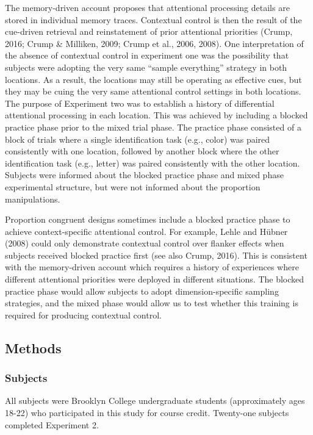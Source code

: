 \documentclass[english,,man,floatsintext]{apa6}
\begin{document}
The memory-driven account proposes that attentional processing details
are stored in individual memory traces. Contextual control is then the
result of the cue-driven retrieval and reinstatement of prior
attentional priorities (Crump, 2016; Crump \& Milliken, 2009; Crump et
al., 2006, 2008). One interpretation of the absence of contextual
control in experiment one was the possibility that subjects were
adopting the very same \enquote{sample everything} strategy in both
locations. As a result, the locations may still be operating as
effective cues, but they may be cuing the very same attentional control
settings in both locations. The purpose of Experiment two was to
establish a history of differential attentional processing in each
location. This was achieved by including a blocked practice phase prior
to the mixed trial phase. The practice phase consisted of a block of
trials where a single identification task (e.g., color) was paired
consistently with one location, followed by another block where the
other identification task (e.g., letter) was paired consistently with
the other location. Subjects were informed about the blocked practice
phase and mixed phase experimental structure, but were not informed
about the proportion manipulations.

Proportion congruent designs sometimes include a blocked practice phase
to achieve context-specific attentional control. For example, Lehle and
Hübner (2008) could only demonstrate contextual control over flanker
effects when subjects received blocked practice first (see also Crump,
2016). This is consistent with the memory-driven account which requires
a history of experiences where different attentional priorities were
deployed in different situations. The blocked practice phase would allow
subjects to adopt dimension-specific sampling strategies, and the mixed
phase would allow us to test whether this training is required for
producing contextual control.

\subsection{Methods}\label{methods-1}

\subsubsection{Subjects}\label{subjects-1}

All subjects were Brooklyn College undergraduate students (approximately
ages 18-22) who participated in this study for course credit. Twenty-one
subjects completed Experiment 2.
\end{document}

